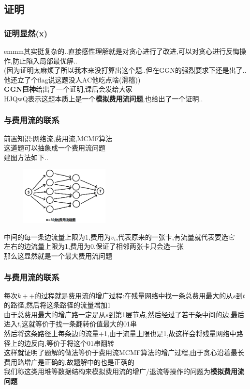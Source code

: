 \documentclass{beamer}
\begin{document}
		\subsection{证明}
			\begin{frame}\frametitle{证明显然(x)}
				emmm其实挺复杂的..直接感性理解就是对贪心进行了改进,可以对贪心进行反悔操作,防止陷入局部最优解..\\
				(因为证明太麻烦了所以我本来没打算出这个题..但在GGN的强烈要求下还是出了..他还立了个flag说这题没人AC他吃点啥(滑稽))\\
				\textbf{GGN巨神}给出了一个证明,课后会发给大家\\
				HJQwQ表示这题本质上是一个\textbf{模拟费用流问题},也给出了一个证明..
			\end{frame}
			\begin{frame}\frametitle{与费用流的联系}
				前置知识:网络流,费用流,MCMF算法\\
				这道题可以抽象成一个费用流问题\\
				建图方法如下..\\
				\begin{figure}[htbp]
					\centering
					\includegraphics[width=0.4\textwidth]{pictures/6.png}
				\end{figure}
				
				中间的每一条边流量上限为1,费用为$v_i$,代表原来的一张卡,有流量就代表要选它\\
				左右的边流量上限为1,费用为0,保证了相邻两张卡只会选一张\\
				那么这显然就是一个最大费用流问题\\
			\end{frame}
			\begin{frame}\frametitle{与费用流的联系}
				每次$k++$的过程就是费用流的增广过程:在残量网络中找一条总费用最大的从$s$到$t$的路径,然后将这条路径的流量增加1\\
				由于总费用最大的增广路一定是从$s$到第1层节点,然后经过了若干条中间的边,最后进入$t$,这就等价于找一条翻转价值最大的01串\\
				然后将这条路径上每条边的流量+1,由于流量上限也是1,故这样会将残量网络中路径上的边反向,等价于将这个01串翻转\\
				这样就证明了题解的做法等价于费用流MCMF算法的增广过程,由于贪心沿着最长费用路增广是正确的,故题解中的也是正确的\\
				我们称这类用堆等数据结构来模拟费用流的增广/退流等操作的问题为\textbf{模拟费用流问题}\\
			\end{frame}
\end{document}

